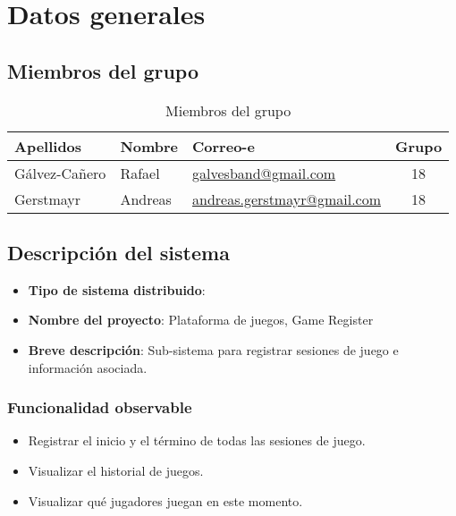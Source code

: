 \chapter{Datos generales}

\section{Miembros del grupo}

\begin{table}[htdp]
\begin{center}
\begin{tabular}{|l|l|l|c|}
\hline
\textbf{Apellidos}&\textbf{Nombre}&\textbf{Correo-e}&\textbf{Grupo}\\
\hline
Gálvez-Cañero&Rafael&\href{mailto:galvesband@gmail.com}{galvesband@gmail.com}&18\\
Gerstmayr&Andreas&\href{mailto:andreas.gerstmayr@gmail.com}{andreas.gerstmayr@gmail.com}&18\\
\hline
\end{tabular}
\end{center}
\caption{Miembros del grupo}
\label{tab:miembros}
\end{table}%


\section{Descripción del sistema}

\begin{itemize}
\item \textbf{Tipo de sistema distribuido}:
\item \textbf{Nombre del proyecto}: Plataforma de juegos, Game Register
\item \textbf{Breve descripción}: Sub-sistema para registrar sesiones de juego e información asociada.
\end{itemize}

\subsection{Funcionalidad observable}

\begin{itemize}
\item Registrar el inicio y el término de todas las sesiones de juego.
\item Visualizar el historial de juegos.
\item Visualizar qué jugadores juegan en este momento.
\end{itemize}

